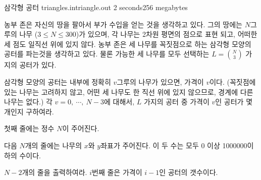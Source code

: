 \begin{problem}{삼각형 공터}
	{triangles.in}{triangle.out}
	{2 seconds}{256 megabytes}{}
	

	농부 존은 자신의 땅을 팔아서 부가 수입을 얻는 것을 생각하고 있다. 그의 땅에는 $N$그루의 나무 ($3 \le N \le 300$)가 있으며, 각 나무는 2차원 평면의 점으로 표현 되고, 어떠한 세 점도 일직선 위에 있지 않다. 농부 존은 세 나무를 꼭짓점으로 하는 삼각형 모양의 공터를 파는것을 생각하고 있다. 물론 가능한 세 나무를 모두 선택하는 $L={N \choose 3}$ 가지의 공터가 있다.

	삼각형 모양의 공터는 내부에 정확히 $v$그루의 나무가 있으면, 가격이 $v$이다. (꼭짓점에 있는 나무는 고려하지 않고, 어떤 세 나무도 한 직선 위에 있지 않으므로, 경계에 다른 나무는 없다.) 각 $v=0, \ \cdots, \ N-3$에 대해서, $L$ 가지의 공터 중 가격이 $v$인 공터가 몇 개인지 구하여라.

	
	\InputFile
	
	첫째 줄에는 정수 $N$이 주어진다.
	
	다음 $N$개의 줄에는 나무의 $x$와 $y$좌표가 주어진다. 이 두 수는 모두 0 이상 1000000이하의 수이다.
	
	\OutputFile
	
	$N-2$개의 줄을 출력하여라. $i$번째 줄은 가격이 $i-1$인 공터의 갯수이다.
	
	\Examples
	
	\begin{example}
	\end{example}

	
\end{problem}

